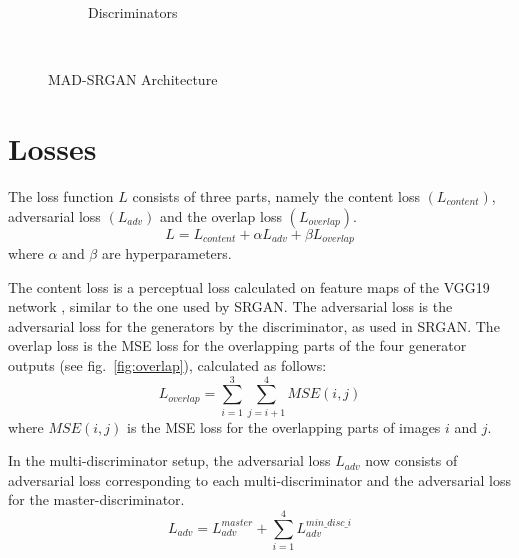 \documentclass[12pt,a4paper,twocolumn]{article}
\begin{document}
\begin{figure}
\begin{subfigure}{0.4\textwidth}
                \caption{Discriminators}
            \end{subfigure}\\[3mm]
            \caption{MAD-SRGAN Architecture}
            \label{fig:gen-arch}
        \end{figure}

    \section{Losses}
        The loss function $L$ consists of three parts, namely the content loss $(L_{content})$, adversarial loss $(L_{adv})$ and the overlap loss $(L_{overlap})$.\\
            $$L = L_{content} + \alpha L_{adv} + \beta L_{overlap}$$
        where $\alpha$ and $\beta$ are hyperparameters.

        The content loss is a perceptual loss \cite{perceptual} calculated on feature maps of the VGG19 network \cite{vgg}, similar to the one used by SRGAN.
        The adversarial loss is the adversarial loss for the generators by the discriminator, as used in SRGAN.
        The overlap loss is the MSE loss for the overlapping parts of the four generator outputs (see fig.~\ref{fig:overlap}), calculated as follows:
            $$L_{overlap} = \sum_{i=1}^3 \sum_{j=i+1}^4 MSE(i, j)$$
        where $MSE(i, j)$ is the MSE loss for the overlapping parts of images $i$ and $j$.

        In the multi-discriminator setup, the adversarial loss $L_{adv}$ now  consists of adversarial loss corresponding to each multi-discriminator and the adversarial loss for the master-discriminator.
            $$L_{adv} = L_{adv}^{master} + \sum_{i=1}^{4}L_{adv}^{min\_disc\_i}$$
\end{document}
